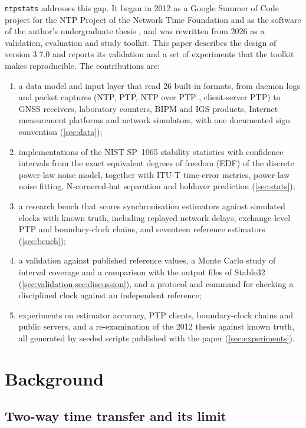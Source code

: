 \documentclass[11pt,a4paper]{article}
\newcommand{\ntp}{\texttt{ntpstats}}
\begin{document}
\ntp{} addresses this gap. It began in 2012 as a Google Summer of Code project for the NTP Project of
the Network Time Foundation and as the software of the author's undergraduate thesis
\citep{araujo2012tcc}, and was rewritten from 2026 as a validation, evaluation and study toolkit.
This paper describes the design of version 3.7.0 and reports its validation and a set of experiments
that the toolkit makes reproducible. The contributions are:
\begin{enumerate}[label=(\roman*)]
\item a data model and input layer that read 26 built-in formats, from daemon logs and packet captures
  (NTP, PTP, NTP over PTP \citep{rfc10030}, client-server PTP) to GNSS receivers, laboratory counters,
  BIPM and IGS products, Internet measurement platforms and network simulators, with one documented
  sign convention (\cref{sec:data});
\item implementations of the NIST SP~1065 stability statistics with confidence intervals from the
  exact equivalent degrees of freedom (EDF) of the discrete power-law noise model, together with ITU-T
  time-error metrics, power-law noise fitting, N-cornered-hat separation and holdover prediction
  (\cref{sec:stats});
\item a research bench that scores synchronisation estimators against simulated clocks with known
  truth, including replayed network delays, exchange-level PTP and boundary-clock chains, and seventeen
  reference estimators (\cref{sec:bench});
\item a validation against published reference values, a Monte Carlo study of interval coverage and
  a comparison with the output files of Stable32 (\cref{sec:validation,sec:discussion}), and a
  protocol and command for checking a disciplined clock against an independent reference;
\item experiments on estimator accuracy, PTP clients, boundary-clock chains and public servers, and a
  re-examination of the 2012 thesis against known truth, all generated by seeded scripts published
  with the paper (\cref{sec:experiments}).
\end{enumerate}

\section{Background}\label{sec:background}

\subsection{Two-way time transfer and its limit}
\end{document}
